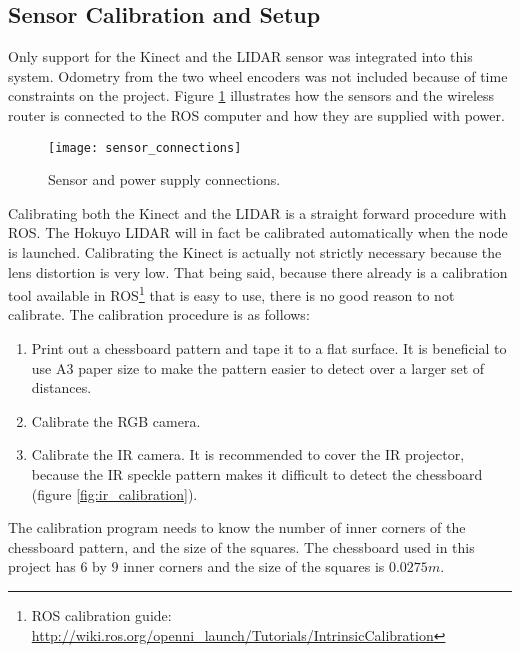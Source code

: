 \subsection{Sensor Calibration and Setup}

Only support for the Kinect and the \ac{LIDAR} sensor was integrated into this system. Odometry from the two wheel encoders was not included because of time constraints on the project. Figure \ref{fig:sensor_connections} illustrates how the sensors and the wireless router is connected to the \ac{ROS} computer and how they are supplied with power.

\begin{figure}[h]
	\centering
	\texttt{[image: sensor\_connections]}
	\caption{Sensor and power supply connections. }
	\label{fig:sensor_connections}
\end{figure}

Calibrating both the Kinect and the \ac{LIDAR} is a straight forward procedure with \ac{ROS}. The Hokuyo \ac{LIDAR} will in fact be calibrated automatically when the node is launched. Calibrating the Kinect is actually not strictly necessary because the lens distortion is very low. That being said, because there already is a calibration tool available in \ac{ROS}\footnote{ROS calibration guide: \url{http://wiki.ros.org/openni_launch/Tutorials/IntrinsicCalibration}} that is easy to use, there is no good reason to not calibrate. The calibration procedure is as follows:

\begin{enumerate}
	\item Print out a chessboard pattern and tape it to a flat surface. It is beneficial to use A3 paper size to make the pattern easier to detect over a larger set of distances.
	\item Calibrate the RGB camera.
	\item Calibrate the IR camera. It is recommended to cover the IR projector, because the IR speckle pattern makes it difficult to detect the chessboard (figure \ref{fig:ir_calibration}).
\end{enumerate}

The calibration program needs to know the number of inner corners of the chessboard pattern, and the size of the squares. The chessboard used in this project has $6$ by $9$ inner corners and the size of the squares is $0.0275 m$.

